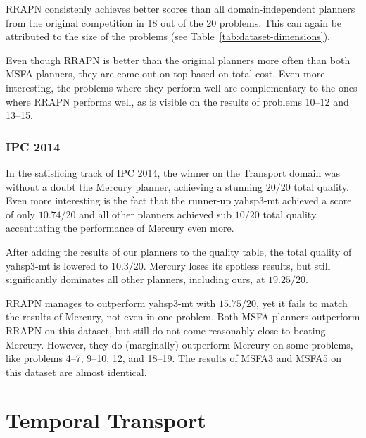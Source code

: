 RRAPN consistenly achieves better scores than all domain-independent planners from the original competition in 18 out of the 20 problems. This can again be attributed to the size
of the problems (see Table~\ref{tab:dataset-dimensions}).

Even though RRAPN is better than the original planners more often than both MSFA planners,
they are come out on top based on total cost. Even more interesting, the problems
where they perform well are complementary to the ones where RRAPN performs well,
as is visible on the results of problems 10--12 and 13--15.

\subsubsection{IPC 2014}

In the satisficing track of IPC 2014, the winner on the Transport domain
was without a doubt the Mercury planner, achieving
a stunning $20/20$ total quality. Even more interesting is the fact that
the runner-up yahsp3-mt achieved a score of only $10.74/20$
and all other planners achieved sub $10/20$ total quality,
accentuating the performance of Mercury even more.

After adding the results of our planners to the quality table,
the total quality of yahsp3-mt is lowered to $10.3/20$.
Mercury loses its spotless results, but still significantly dominates all
other planners, including ours, at $19.25/20$.

RRAPN manages to outperform yahsp3-mt with $15.75/20$, yet it fails
to match the results of Mercury, not even in one problem.
Both MSFA planners outperform RRAPN on this dataset,
but still do not come reasonably close to beating Mercury.
However, they do (marginally) outperform Mercury on some problems, like
problems 4--7, 9--10, 12, and 18--19.
The results of MSFA3 and MSFA5 on this dataset are almost identical.


















\section{Temporal Transport}


